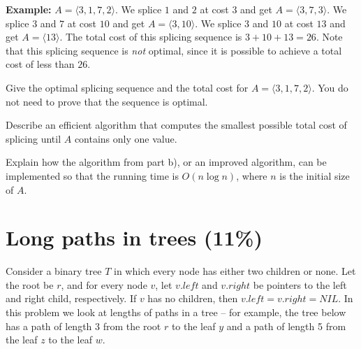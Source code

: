 \medskip

\textbf{Example:}
$A=\langle 3,1,7,2\rangle$.
We splice $1$ and $2$ at cost $3$ and get $A=\langle 3,7,3\rangle$.
We splice $3$ and $7$ at cost $10$ and get $A=\langle 3,10\rangle$.
We splice $3$ and $10$ at cost $13$ and get $A=\langle 13\rangle$.
The total cost of this splicing sequence is $3+10+13=26$.
Note that this splicing sequence is \emph{not} optimal, since it is possible to achieve a total cost of less than $26$.

{
Give the optimal splicing sequence and the total cost for $A=\langle 3,1,7,2\rangle$. You do not need to prove that the sequence is optimal.
}


{
Describe an efficient algorithm that computes the smallest possible total cost of splicing until $A$ contains only one value.
}


{
Explain how the algorithm from part b), or an improved algorithm, can be implemented so that the running time is $O(n\log n)$, where $n$ is the initial size of $A$.
}


\newpage
\section{Long paths in trees (11\%)}%

Consider a binary tree $T$ in which every node has either two children or none.
Let the root be $r$, and for every node $v$, let $v.left$ and $v.right$ be pointers to the left and right child, respectively.
If $v$ has no children, then $v.left=v.right=NIL$.
In this problem we look at lengths of paths in a tree -- for example, the tree below has a path of length 3 from the root $r$ to the leaf $y$ and a path of length 5 from the leaf $z$ to the leaf $w$.
%
\begin{center}
\end{center}


